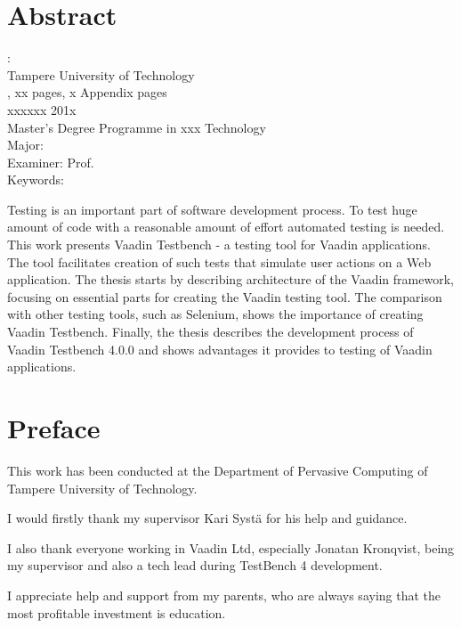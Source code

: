 \documentclass[12pt,a4paper,english%
]{tutthesis}
\begin{document}
\chapter*{Abstract}
\begin{spacing}{1.0}
         {\bf \textsf{\MakeUppercase{\@author}}}: \@title\\   %
         \textsf{Tampere University of Technology}\\
         \textsf{\@thesistype, xx pages, x Appendix pages} \\
         \textsf{xxxxxx 201x}\\
         \textsf{Master's Degree Programme in xxx Technology}\\
         \textsf{Major: }\\
         \textsf{Examiner: Prof. \@examiner}\\ %
         \textsf{Keywords: }\\
\end{spacing}

Testing is an important part of software development process.
To test huge amount of code with a reasonable amount of effort automated testing is needed. 
This work presents Vaadin Testbench - a testing tool for Vaadin applications.
The tool facilitates creation of such tests that simulate user actions on a Web application.
The thesis starts by  describing architecture of the Vaadin framework, focusing
on essential parts for creating the Vaadin testing tool. The comparison with other testing tools, such as Selenium,
 shows the importance of creating Vaadin Testbench.
  Finally, the thesis describes the development process of Vaadin Testbench
  4.0.0 and shows advantages it provides to testing of Vaadin applications.

\makeatother %
\chapter*{Preface}
This work has been conducted at the Department of Pervasive Computing of Tampere 
University of Technology.

I would firstly thank my supervisor Kari Syst{\"a} for his help and guidance.

I also thank everyone working in Vaadin Ltd, especially Jonatan Kronqvist,
being my supervisor and also a tech lead during TestBench 4 development.

I appreciate help and support from my parents, who are always saying that
the most profitable investment is education.
\end{document}
